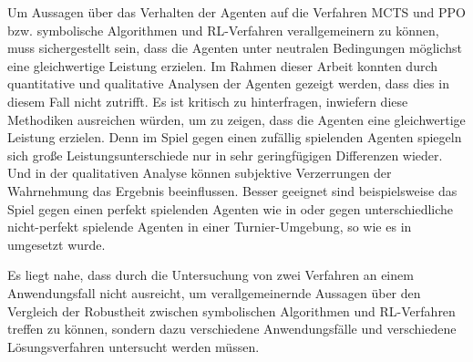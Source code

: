 Um Aussagen über das Verhalten der Agenten auf die Verfahren MCTS und PPO bzw. symbolische Algorithmen und RL-Verfahren verallgemeinern zu können, muss sichergestellt sein, dass die Agenten unter neutralen Bedingungen möglichst eine gleichwertige Leistung erzielen. Im Rahmen dieser Arbeit konnten durch quantitative und qualitative Analysen der Agenten gezeigt werden, dass dies in diesem Fall nicht zutrifft. Es ist kritisch zu hinterfragen, inwiefern diese Methodiken ausreichen würden, um zu zeigen, dass die Agenten eine gleichwertige Leistung erzielen. Denn im Spiel gegen einen zufällig spielenden Agenten spiegeln sich große Leistungsunterschiede nur in sehr geringfügigen Differenzen wieder. Und in der qualitativen Analyse können subjektive Verzerrungen der Wahrnehmung das Ergebnis beeinflussen. Besser geeignet sind beispielsweise das Spiel gegen einen perfekt spielenden Agenten wie in \cite{Thill.2012} oder gegen unterschiedliche nicht-perfekt spielende Agenten in einer Turnier-Umgebung, so wie es in \cite{Zhong.2020} umgesetzt wurde.

Es liegt nahe, dass durch die Untersuchung von zwei Verfahren an einem Anwendungsfall nicht ausreicht, um verallgemeinernde Aussagen über den Vergleich der Robustheit zwischen symbolischen Algorithmen und RL-Verfahren treffen zu können, sondern dazu verschiedene Anwendungsfälle und verschiedene Lösungsverfahren untersucht werden müssen.
